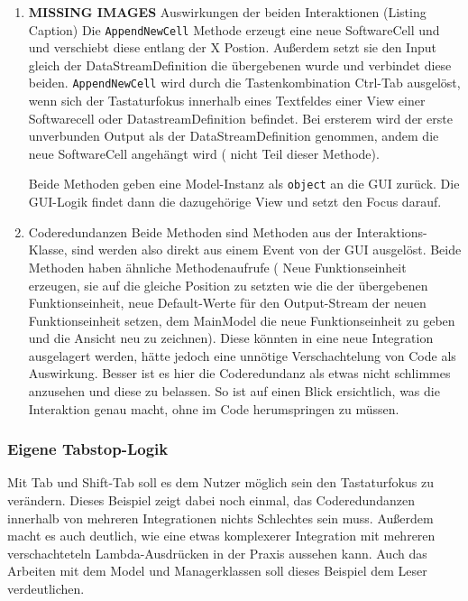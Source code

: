 \begin{enumerate}
	\item {\bfseries\sffamily MISSING IMAGES} Auswirkungen der beiden Interaktionen (Listing Caption)
	\label{sec:orgheadline24}
	Die \texttt{AppendNewCell} Methode erzeugt eine neue SoftwareCell und und
	verschiebt diese entlang der X Postion.
	Außerdem setzt sie den Input gleich der DataStreamDefinition die
	übergebenen wurde und verbindet diese beiden.
	\texttt{AppendNewCell} wird durch die Tastenkombination Ctrl-Tab ausgelöst, wenn
	sich der Tastaturfokus innerhalb eines Textfeldes einer View einer Softwarecell oder
	DatastreamDefinition befindet. Bei ersterem wird der erste unverbunden Output als der
	DataStreamDefinition genommen, andem die neue SoftwareCell angehängt wird (
	nicht Teil dieser Methode).
	
	Beide Methoden geben eine
	Model-Instanz als \texttt{object} an die GUI zurück. Die GUI-Logik findet dann die
	dazugehörige View und setzt den Focus darauf.
	
	\item Coderedundanzen
	\label{sec:orgheadline25}
	Beide Methoden sind Methoden aus der Interaktions-Klasse, sind werden also
	direkt aus einem Event von der GUI ausgelöst. 
	Beide Methoden haben ähnliche Methodenaufrufe ( Neue Funktionseinheit
	erzeugen, sie auf die gleiche Position zu setzten wie die der übergebenen
	Funktionseinheit, neue Default-Werte für den Output-Stream der neuen
	Funktionseinheit setzen, dem MainModel die neue Funktionseinheit zu geben
	und die Ansicht neu zu zeichnen). Diese könnten in eine neue
	Integration ausgelagert werden, hätte jedoch eine unnötige
	Verschachtelung von Code als Auswirkung. Besser ist es hier die
	Coderedundanz als etwas nicht schlimmes anzusehen und diese zu belassen.
	So ist auf einen Blick ersichtlich, was die Interaktion genau macht, ohne
	im Code herumspringen zu müssen.
\end{enumerate}

\subsubsection{Eigene Tabstop-Logik}
\label{sec:orgheadline31}
Mit Tab und Shift-Tab soll es dem Nutzer möglich sein den Tastaturfokus zu
verändern. Dieses Beispiel zeigt dabei noch einmal, das Coderedundanzen innerhalb
von mehreren Integrationen nichts Schlechtes sein muss.
Außerdem macht es auch deutlich, wie eine etwas komplexerer Integration mit
mehreren verschachteteln Lambda-Ausdrücken in der Praxis aussehen kann.
Auch das Arbeiten mit dem Model und Managerklassen soll
dieses Beispiel dem Leser verdeutlichen.


